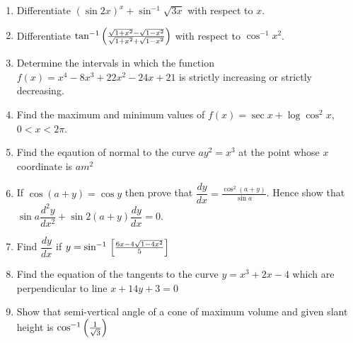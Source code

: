 \begin{enumerate}
	\item Differentiate $(\sin 2x)^x + \sin^{-1} \sqrt{3x}$ with respect to $x$.
	
	\item Differentiate $\tan^{-1} \left(\frac{\sqrt{1 + x^2}-\sqrt{1-x^2}}{\sqrt{1+x^2}+\sqrt{1-x^2}}\right)$
with respect to $\cos^{-1} x^2$.

	\item Determine the intervals in which the function $f (x) = x^4 - 8x^3 + 22x^2 - 24x+21$ is strictly increasing or strictly decreasing.

	\item Find the maximum and minimum values of $f (x) = \sec x + \log \cos^2 x$, $0 < x < 2\pi$.

	\item Find the eqaution of normal to the curve $ay^2 = x^3$ at the point whose $x$ coordinate is $am^2$
	
	
	\item If $\cos(a+y) = \cos y$ then prove that
$\dfrac{dy}{dx} = \frac{\cos^{2}(a+y)}{\sin a}$. 
Hence show that \\
$\sin a \dfrac{d^{2}y}{dx^{2}} + \sin 2(a+y)\dfrac{dy}{dx} = 0 $.

	\item Find $\dfrac{dy}{dx}$ if $y = \sin^{-1}{}\left[\frac{6x - 4\sqrt{1-4x^2}}{5}\right]$ 

	\item Find the equation of the tangents to the curve $y = x^3 + 2x - 4$ which are perpendicular to line $x + 14y + 3 = 0$
	
	\item Show that semi-vertical angle of a cone of maximum volume and given slant height is
$\cos^{-1}\left( \frac{1}{\sqrt{3}}\right)$


\end{enumerate}
